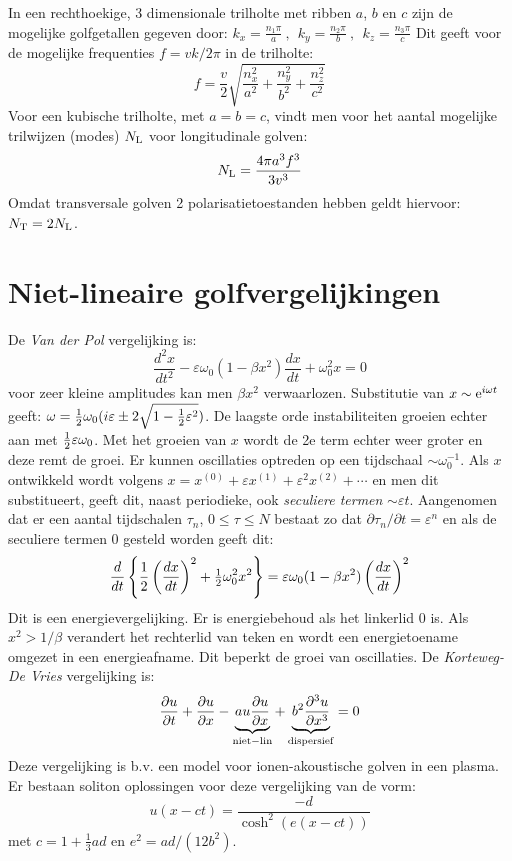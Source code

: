 \documentclass[twoside]{report}
\begin{document}
In een rechthoekige, 3 dimensionale trilholte met ribben $a$, $b$ en $c$ zijn
de mogelijke golfgetallen gegeven door:
$\displaystyle k_x=\frac{n_1\pi}{a}~,~~k_y=\frac{n_2\pi}{b}~,~~k_z=\frac{n_3\pi}{c}$
Dit geeft voor de mogelijke frequenties $f=vk/2\pi$ in de trilholte:
\[
f=\frac{v}{2}\sqrt{\frac{n_x^2}{a^2}+\frac{n_y^2}{b^2}+\frac{n_z^2}{c^2}}
\]
Voor een kubische trilholte, met $a=b=c$, vindt men voor het aantal mogelijke
trilwijzen (modes) $N_{\rm L}$ voor longitudinale golven:
\[
N_{\rm L}=\frac{4\pi a^3f^3}{3v^3}
\]
Omdat transversale golven 2 polarisatietoestanden hebben geldt hiervoor:
$N_{\rm T}=2N_{\rm L}$.

\section{Niet-lineaire golfvergelijkingen}
De {\it Van der Pol} vergelijking is:
\[
\frac{d^2x}{dt^2}-\varepsilon\omega_0(1-\beta x^2)\frac{dx}{dt}+\omega_0^2x=0
\]
voor zeer kleine amplitudes kan men $\beta x^2$ verwaarlozen. Substitutie van
$x\sim{\rm e}^{i\omega t}$ geeft:
$\omega=\mbox{$\frac{1}{2}$}\omega_0(i\varepsilon\pm2\sqrt{1-\frac{1}{2}\varepsilon^2})$.
De laagste orde instabiliteiten groeien echter aan met
$\mbox{$\frac{1}{2}$}\varepsilon\omega_0$. Met het groeien van $x$ wordt de 2e term echter
weer groter en deze remt de groei. Er kunnen oscillaties optreden op een
tijdschaal $\sim\omega_0^{-1}$. Als $x$ ontwikkeld wordt volgens
$x=x^{(0)}+\varepsilon x^{(1)}+\varepsilon^2x^{(2)}+\cdots$ en men dit
substitueert, geeft dit, naast periodieke, ook {\it seculiere termen}
$\sim\varepsilon t$. Aangenomen dat er een aantal tijdschalen $\tau_n$,
$0\leq\tau\leq N$ bestaat zo dat $\partial\tau_n/\partial t=\varepsilon^n$ en
als de seculiere termen 0 gesteld worden geeft dit:
\[
\frac{d}{dt}\left\{\frac{1}{2}\left(\frac{dx}{dt}\right)^2+\mbox{$\frac{1}{2}$}\omega_0^2x^2\right\}=
\varepsilon\omega_0(1-\beta x^2)\left(\frac{dx}{dt}\right)^2
\]
Dit is een energievergelijking. Er is energiebehoud als het linkerlid 0 is.
Als $x^2>1/\beta$ verandert het rechterlid van teken en wordt een
energietoename omgezet in een energieafname. Dit beperkt de groei van
oscillaties.
\npar
De {\it Korteweg-De Vries} vergelijking is:
\[
\frac{\partial u}{\partial t}+\frac{\partial u}{\partial x}-\underbrace{au\frac{\partial u}{\partial x}}_{\rm niet-lin}+
\underbrace{b^2\frac{\partial ^3u}{\partial x^3}}_{\rm dispersief}=0
\]
Deze vergelijking is b.v. een model voor ionen-akoustische golven in een
plasma. Er bestaan soliton oplossingen voor deze vergelijking van de vorm:
\[
u(x-ct)=\frac{-d}{\cosh^2(e(x-ct))}
\]
met $c=1+\frac{1}{3}ad$ en $e^2=ad/(12b^2)$.
\end{document}
